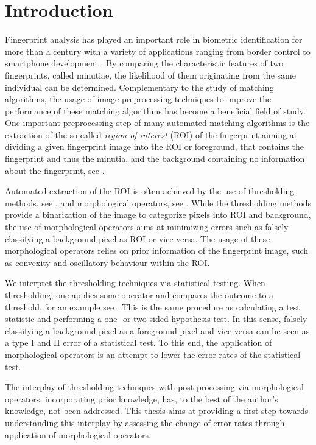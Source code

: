 \documentclass[a4paper,12pt]{article}
\theoremstyle{plain}
\theoremstyle{definition}
\begin{document}
\newpage



\section{Introduction}\label{section: introduction}

Fingerprint analysis has played an important role in biometric identification for more than a century with a variety of applications ranging from border control to smartphone development \cite{Henry}. By comparing the characteristic features of two fingerprints, called minutiae, the likelihood of them originating from the same individual can be determined. Complementary to the study of matching algorithms, the usage of image preprocessing techniques to improve the performance of these matching algorithms has become a beneficial field of study. One important preprocessing step of many automated matching algorithms is the extraction of the so-called \emph{region of interest} (ROI) of the fingerprint aiming at dividing a given fingerprint image into the ROI or foreground, that contains the fingerprint and thus the minutia, and the background containing no information about the fingerprint, see \cite{handbookfipri}.

Automated extraction of the ROI is often achieved by the use of thresholding methods, see \cite{FDB}, and morphological operators, see \cite{FDB, BazenGerez, adaboost}. While the thresholding methods provide a binarization of the image to categorize pixels into ROI and background, the use of morphological operators aims at minimizing errors such as falsely classifying a background pixel as ROI or vice versa. The usage of these morphological operators relies on prior information of the fingerprint image, such as convexity and oscillatory behaviour within the ROI.

We interpret the thresholding techniques via statistical testing. When thresholding, one applies some operator and compares the outcome to a threshold, for an example see \cite{AbramovichBenjamini1996}. This is the same procedure as calculating a test statistic and performing a one- or two-sided hypothesis test. In this sense, falsely classifying a background pixel as a foreground pixel and vice versa can be seen as a type I and II error of a statistical test. To this end, the application of morphological operators is an attempt to lower the error rates of the statistical test.

The interplay of thresholding techniques with post-processing via morphological operators, incorporating prior knowledge, has, to the best of the author's knowledge, not been addressed. This thesis aims at providing a first step towards understanding this interplay by assessing the change of error rates through application of morphological operators.
\end{document}
